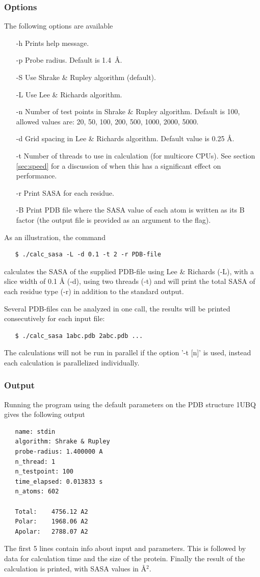 \documentclass[a4paper,11pt]{article}
\begin{document}
\subsubsection{Options}
The following options are available
\begin{itemize}
  \item[-h] Prints help message.
  \item[-p] Probe radius. Default is 1.4~\AA.
  \item[-S] Use Shrake \& Rupley algorithm (default).
  \item[-L] Use Lee \& Richards algorithm.
  \item[-n] Number of test points in Shrake \& Rupley algorithm.
    Default is 100, allowed values are: 20, 50, 100, 200, 500, 1000,
    2000, 5000.
  \item[-d] Grid spacing in Lee \& Richards algorithm.
  Default value is 0.25 Å.
  \item[-t] Number of threads to use in calculation (for multicore
    CPUs). See section \ref{sec:speed} for a discussion of when this
    has a significant effect on performance.
  \item[-r] Print SASA for each residue.
  \item[-B] Print PDB file where the SASA value of each atom is
    written as its B factor (the output file is provided as an
    argument to the flag).
\end{itemize}
As an illustration, the command
\begin{verbatim}
   $ ./calc_sasa -L -d 0.1 -t 2 -r PDB-file
\end{verbatim}
calculates the SASA of the supplied PDB-file using Lee \& Richards (-L),
with a slice width of 0.1 Å (-d), using two threads (-t) and will print the
total SASA of each residue type (-r) in addition to the standard output.

Several PDB-files can be analyzed in one call, the results will be
printed consecutively for each input file:
\begin{verbatim}
   $ ./calc_sasa 1abc.pdb 2abc.pdb ...
\end{verbatim}
The calculations will not be run in parallel if the option '-t [n]' is
used, instead each calculation is parallelized individually.

\subsubsection{Output}
Running the program using the default parameters on the PDB structure
1UBQ gives the following output
\begin{verbatim}
   name: stdin
   algorithm: Shrake & Rupley
   probe-radius: 1.400000 A
   n_thread: 1
   n_testpoint: 100
   time_elapsed: 0.013833 s
   n_atoms: 602
   
   Total:    4756.12 A2
   Polar:    1968.06 A2
   Apolar:   2788.07 A2
\end{verbatim}
The first 5 lines contain info about input and parameters. This is
followed by data for calculation time and the size of the
protein. Finally the result of the calculation is printed, with SASA
values in Å$^2$.
\end{document}
